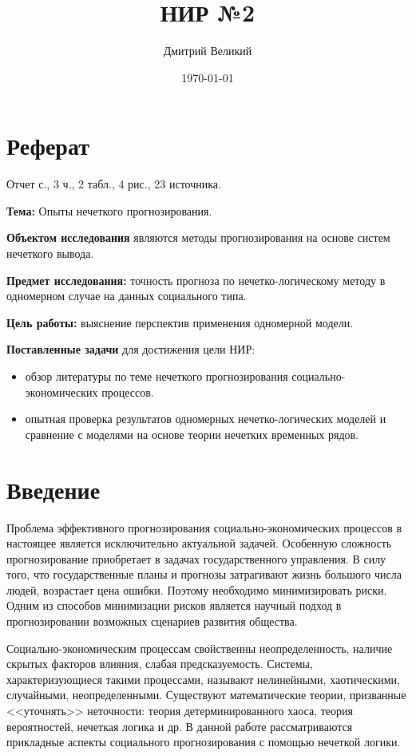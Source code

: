 \documentclass[a4paper,14pt]{article}
\author{Дмитрий Великий}
\title{НИР №2}
\date{\today}
\begin{document}


\tableofcontents

\newpage
\section*{\centering Реферат}
Отчет \pageref{LastPage} с., 3 ч., 2 табл., 4 рис., 23 источника.

\textbf{Тема:} Опыты нечеткого прогнозирования.

\textbf{Объектом исследования} являются методы прогнозирования на основе систем нечеткого вывода.

\textbf{Предмет исследования:} точность прогноза по нечетко-логическому методу в одномерном случае на данных социального типа.

\textbf{Цель работы:} выяснение перспектив применения одномерной модели.

\textbf{Поставленные задачи} для достижения цели НИР:
\begin{itemize}
	\item обзор литературы по теме нечеткого прогнозирования социально-экономических процессов.
	\item опытная проверка результатов одномерных нечетко-логических моделей и сравнение с	моделями на основе теории нечетких временных рядов.
\end{itemize}

\newpage
\section*{Введение}

Проблема эффективного прогнозирования социально-экономических процессов в настоящее является исключительно актуальной задачей. Особенную сложность прогнозирование приобретает в задачах государственного управления. В силу того, что государственные планы и прогнозы затрагивают жизнь большого числа людей, возрастает цена ошибки. Поэтому необходимо минимизировать риски. Одним из способов минимизации рисков является научный подход в прогнозировании возможных сценариев развития общества.  

Социально-экономическим процессам свойственны неопределенность, наличие скрытых факторов влияния, слабая предсказуемость. Системы, характеризующиеся такими процессами, называют нелинейными, хаотическими, случайными, неопределенными. Существуют математические теории, призванные <<уточнять>> неточности: теория детерминированного хаоса, теория вероятностей, нечеткая логика и др. В данной работе рассматриваются прикладные аспекты социального прогнозирования с помощью нечеткой логики.
\end{document}
